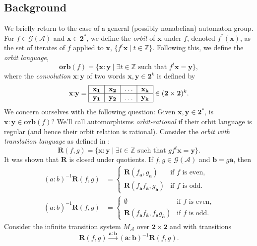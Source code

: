 \documentclass[12pt, letterpaper]{article}
\newcommand{\Z}{\mathbb Z}
\newcommand{\bin}{\mathbf 2}
\newcommand{\A}{\mathcal A}
\newcommand{\ch}[1]{\mathbf{#1}}
\newcommand{\res}[2]{{{#1}_{\ch{#2}}}}
\newcommand{\gp}{\mathcal G}
\newcommand{\R}{\mathbf R}
\newcommand{\f}[1]{\overline{#1}}
\newcommand{\orb}{\mathbf{orb}}
\begin{document}
\subsection{Background}
We briefly return to the case of a general (possibly nonabelian) automaton
group.  For $f \in \gp(\A)$ and $\ch{x} \in \bin^*$, we define the \emph{orbit}
of $\ch{x}$ under $f$, denoted $f^*(\ch{x})$, as the set of iterates of $f$
applied to $\ch{x}$, $\{f^t \ch{x} \mid t \in \Z\}$. Following this, we define
the \emph{orbit language},
\[
    \orb(f) = \{\ch{x} {:} \ch{y} \mid \exists t \in \Z \text{ such that }
    f^t \ch{x} = \ch{y}\},
\]
where the \emph{convolution} $\ch{x} {:} \ch{y}$ of two words $\ch{x}, \ch{y}
\in \bin^k$ is defined by
\[
    \ch{x} {:} \ch{y} = \begin{tabular}{|c|c|c|c|}
        \hline
        $\ch{x_1}$ & $\ch{x_2}$ & $\ldots$ & $\ch{x_k}$\\
        \hline
        $\ch{y_1}$ & $\ch{y_2}$ & $\ldots$ & $\ch{y_k}$\\
        \hline
    \end{tabular} \in (\bin \times \bin)^k.
\]
We concern ourselves with the following question: Given $\ch{x}, \ch{y} \in
\bin^*$, is $\ch{x} {:} \ch{y} \in \orb(f)$? We'll call automorphisms
\emph{orbit-rational} if their orbit language is regular (and hence their orbit
relation is rational).  Consider the \emph{orbit with translation language} as
defined in
\cite{jalc170214}:
\[
    \R(f,g) =
    \{\ch{x} {:} \ch{y} \mid \exists t \in \Z \text{ such that } g f^t
    \ch{x} = \ch{y}\}.
\]
It was shown that $\R$ is closed under quotients. If
$f, g \in \gp(\A)$ and $\ch{b} = g \ch{a}$, then
\begin{align*}
    (a {:} b)^{-1} \R(f, g) &=
    \begin{cases}
        \R(\res{f}{a}, \res{g}{a}) & \text{if $f$ is even,}\\
        \R(\res{f}{a}\res{f}{\f{a}}, \res{g}{a}) & \text{if $f$ is odd.}
    \end{cases}\\
    (a {:} \f{b})^{-1} \R(f, g) &=
    \begin{cases}
        \emptyset & \text{if $f$ is even,}\\
        \R(\res{f}{a}\res{f}{\f{a}}, \res{f}{a}\res{g}{\f{a}}) &
        \text{if $f$ is odd.}
    \end{cases}
\end{align*}
Consider the infinite transition system $M_\A$ over $\bin \times \bin$ and
with transitions
\[
    \R(f, g) \xrightarrow{\ch{a} {:} \ch{b}} (\ch{a} {:} \ch{b})^{-1} \R(f,g).
\]
\end{document}
